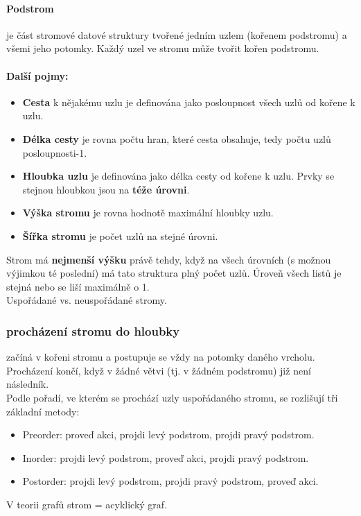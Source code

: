 \documentclass[10pt,a4paper]{article}
\begin{document}
\paragraph{Podstrom}
je část stromové datové struktury tvořené jedním uzlem (kořenem podstromu) a všemi jeho potomky. Každý uzel ve stromu může tvořit kořen podstromu.
\paragraph{Další pojmy:}
\begin{itemize}
	\item \textbf{Cesta} k nějakému uzlu je definována jako posloupnost všech uzlů od kořene k uzlu.
	\item \textbf{Délka cesty} je rovna počtu hran, které cesta obsahuje, tedy počtu uzlů posloupnosti-1.
	\item \textbf{Hloubka uzlu} je definována jako délka cesty od kořene k uzlu. Prvky se stejnou hloubkou jsou na \textbf{téže úrovni}.
	\item \textbf{Výška stromu} je rovna hodnotě maximální hloubky uzlu.
	\item \textbf{Šířka stromu} je počet uzlů na stejné úrovni.
\end{itemize}
Strom má \textbf{nejmenší výšku} právě tehdy, když na všech úrovních (s možnou výjimkou té poslední) má tato struktura plný počet uzlů. Úroveň všech listů je stejná nebo se liší maximálně o 1. \\ Uspořádané vs. neuspořádané stromy. \\
\subsubsection{procházení stromu do hloubky} začíná v kořeni stromu a postupuje se vždy na potomky daného vrcholu. Procházení končí, když v žádné větvi (tj. v žádném podstromu) již není následník. \\
Podle pořadí, ve kterém se prochází uzly uspořádaného stromu, se rozlišují tři základní metody:
\begin{itemize}
	\item Preorder: proveď akci, projdi levý podstrom, projdi pravý podstrom.
	\item Inorder: projdi levý podstrom, proveď akci, projdi pravý podstrom.
	\item Postorder: projdi levý podstrom, projdi pravý podstrom, proveď akci.
\end{itemize}
V teorii grafů strom = acyklický graf.
\end{document}
